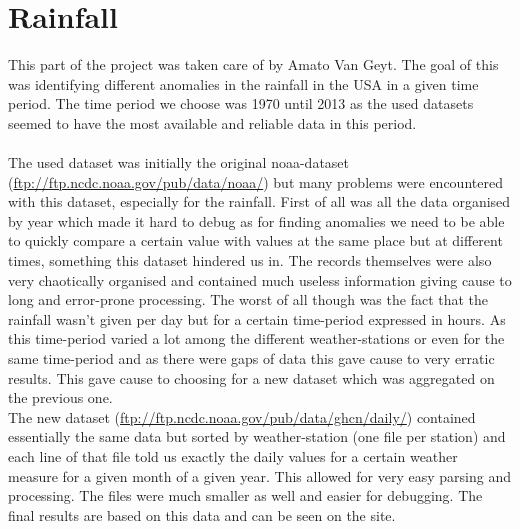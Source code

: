 \section{Rainfall}
This part of the project was taken care of by Amato Van Geyt. The goal of this was identifying different anomalies in the rainfall in the USA in a given time period. The time period we choose was 1970 until 2013 as the used datasets seemed to have the most available and reliable data in this period. \\ \\
The used dataset was initially the original noaa-dataset (\url{ftp://ftp.ncdc.noaa.gov/pub/data/noaa/}) but many problems were encountered with this dataset, especially for the rainfall. First of all was all the data organised by year which made it hard to debug as for finding anomalies we need to be able to quickly compare a certain value with values at the same place but at different times, something this dataset hindered us in. The records themselves were also very chaotically organised and contained much useless information giving cause to long and error-prone processing. The worst of all though was the fact that the rainfall wasn't given per day but for a certain time-period expressed in hours. As this time-period varied a lot among the different weather-stations or even for the same time-period and as there were gaps of data this gave cause to very erratic results. This gave cause to choosing for a new dataset which was aggregated on the previous one. \\ 
The new dataset (\url{ftp://ftp.ncdc.noaa.gov/pub/data/ghcn/daily/}) contained essentially the same data but sorted by weather-station (one file per station) and each line of that file told us exactly the daily values for a certain weather measure for a given month of a given year. This allowed for very easy parsing and processing. The files were much smaller as well and easier for debugging. The final results are based on this data and can be seen on the site.\\ 

